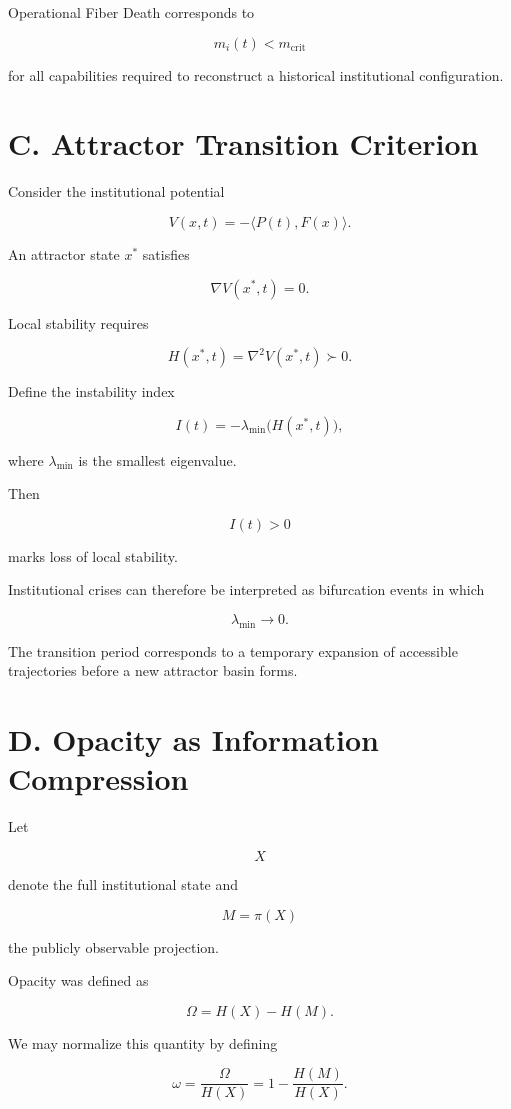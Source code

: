 \documentclass[12pt, a4paper]{article}
\theoremstyle{named}
\begin{document}
Operational Fiber Death corresponds to

\[
m_i(t)
<
m_{\mathrm{crit}}
\]

for all capabilities required to reconstruct a historical
institutional configuration.

\section{C. Attractor Transition Criterion}

Consider the institutional potential

\[
V(x,t)
=
-
\langle P(t),F(x)\rangle.
\]

An attractor state $x^\ast$ satisfies

\[
\nabla V(x^\ast,t)=0.
\]

Local stability requires

\[
H(x^\ast,t)
=
\nabla^2 V(x^\ast,t)
\succ 0.
\]

Define the instability index

\[
I(t)
=
-\lambda_{\min}
\big(
H(x^\ast,t)
\big),
\]

where $\lambda_{\min}$ is the smallest eigenvalue.

Then

\[
I(t) > 0
\]

marks loss of local stability.

Institutional crises can therefore be interpreted as bifurcation
events in which

\[
\lambda_{\min}
\rightarrow 0.
\]

The transition period corresponds to a temporary expansion of
accessible trajectories before a new attractor basin forms.


\section{D. Opacity as Information Compression}

Let

\[
X
\]

denote the full institutional state and

\[
M=\pi(X)
\]

the publicly observable projection.

Opacity was defined as

\[
\Omega
=
H(X)-H(M).
\]

We may normalize this quantity by defining

\[
\omega
=
\frac{\Omega}{H(X)}
=
1-\frac{H(M)}{H(X)}.
\]
\end{document}
